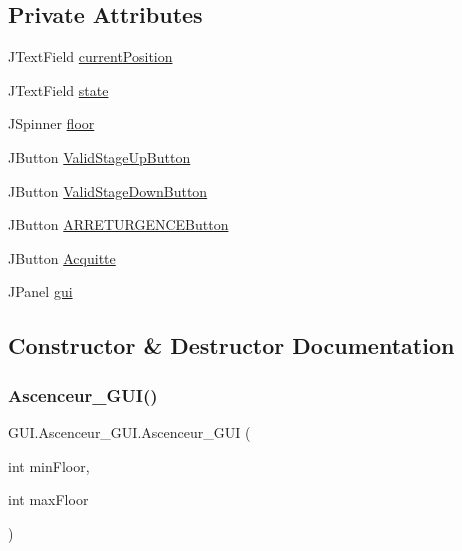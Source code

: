 \subsection*{Private Attributes}
\begin{DoxyCompactItemize}
\item 
J\+Text\+Field \mbox{\hyperlink{class_g_u_i_1_1_ascenceur___g_u_i_aaa6f69264a098a7fbadcfe853783a069}{current\+Position}}
\item 
J\+Text\+Field \mbox{\hyperlink{class_g_u_i_1_1_ascenceur___g_u_i_a1f99cebe25fb106b2d0aa1e97bac6273}{state}}
\item 
J\+Spinner \mbox{\hyperlink{class_g_u_i_1_1_ascenceur___g_u_i_aa64acc152ae61180bd7562623b067190}{floor}}
\item 
J\+Button \mbox{\hyperlink{class_g_u_i_1_1_ascenceur___g_u_i_a257ef4be92d50217d0c21b60f2dd6f4a}{Valid\+Stage\+Up\+Button}}
\item 
J\+Button \mbox{\hyperlink{class_g_u_i_1_1_ascenceur___g_u_i_acfe0faf327b178502fdfd637c38f01eb}{Valid\+Stage\+Down\+Button}}
\item 
J\+Button \mbox{\hyperlink{class_g_u_i_1_1_ascenceur___g_u_i_ae45dc6cecdf71d6c7b0d060e40f2d3eb}{A\+R\+R\+E\+T\+U\+R\+G\+E\+N\+C\+E\+Button}}
\item 
J\+Button \mbox{\hyperlink{class_g_u_i_1_1_ascenceur___g_u_i_a821426dca2822536d0e1650a7765df00}{Acquitte}}
\item 
J\+Panel \mbox{\hyperlink{class_g_u_i_1_1_ascenceur___g_u_i_a4dd1d3a67e47fe40ece22c1d82b5aca8}{gui}}
\end{DoxyCompactItemize}


\subsection{Constructor \& Destructor Documentation}
\mbox{\label{class_g_u_i_1_1_ascenceur___g_u_i_ab1c0ec7e7081e6661b4de2610eddaa0b}} 
\subsubsection{\texorpdfstring{Ascenceur\_GUI()}{Ascenceur\_GUI()}}
{\footnotesize\ttfamily G\+U\+I.\+Ascenceur\+\_\+\+G\+U\+I.\+Ascenceur\+\_\+\+G\+UI (\begin{DoxyParamCaption}\item[{int}]{min\+Floor,  }\item[{int}]{max\+Floor }\end{DoxyParamCaption})}

